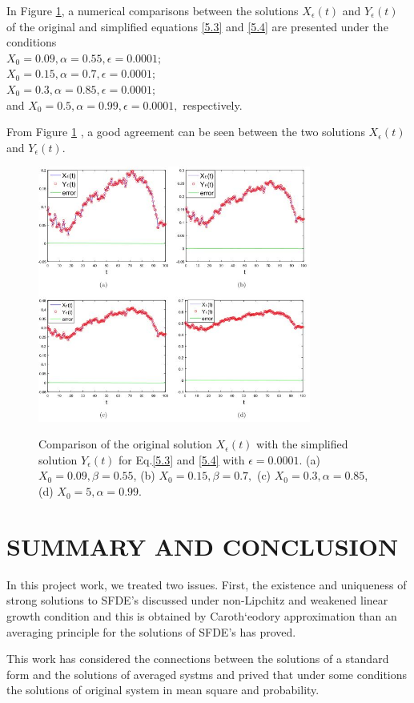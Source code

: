\documentclass[a4 paper, 12pt]{report}
\theoremstyle{plain}
\begin{document}
\par In Figure \ref{figure2}, a numerical comparisons between the solutions $X_\epsilon(t)$ and
$Y_\epsilon(t)$ of the original and simplified equations \eqref{5.3} and \eqref{5.4} are presented under
the conditions \\
$X_0 = 0.09, \alpha = 0.55, \epsilon = 0.0001;$\\
$X_0 = 0.15, \alpha = 0.7, \epsilon = 0.0001;$\\
$X_0 = 0.3, \alpha = 0.85, \epsilon = 0.0001;$\\ 
and
$X_0 = 0.5, \alpha = 0.99, \epsilon = 0.0001,$  respectively.\\
\par From Figure \ref{figure2} , a good agreement can be seen between the two solutions
$X_\epsilon(t)$ and $Y_\epsilon(t)$.
\newpage 
\begin{figure}[hp]
	\centering
		\includegraphics[width=0.80\textwidth]{figure2.JPG}
	\label{figure2}
	\caption{Comparison of the original solution $X_\epsilon(t)$ with the simplified solution $Y_\epsilon(t)$ for Eq.\eqref{5.3}
and \eqref{5.4} with $\epsilon = 0.0001$. (a) $X_0 = 0.09, \beta = 0.55$, (b) $X_0 = 0.15, \beta = 0.7,$ (c) $X_0 = 0.3, \alpha = 0.85$,
(d) $X_0 = 5, \alpha = 0.99.$}
\end{figure}

\chapter{SUMMARY AND CONCLUSION}
\noindent
\par In this project work, we treated two issues. First, the existence and uniqueness of strong solutions to SFDE's discussed under non-Lipchitz and weakened linear growth condition and this is obtained by Caroth`eodory approximation than an averaging principle for the solutions of SFDE's has proved.
\par This work has considered the connections between the solutions of a standard form and the solutions of averaged systms and prived that under some conditions the solutions of original system in mean square and probability.\\
\end{document}
